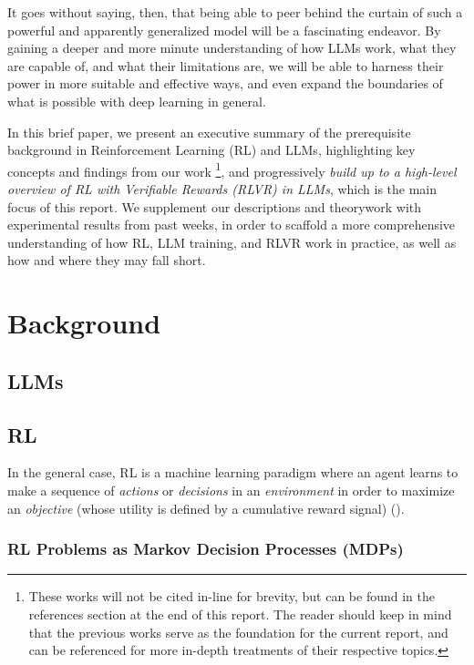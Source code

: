 \documentclass{article} %
\theoremstyle{definition}
\begin{document}
It goes without saying, then, that being able to peer behind the curtain of such a powerful
and apparently generalized model will be a fascinating endeavor. By gaining a deeper
and more minute understanding of how LLMs work, what they are capable of,
and what their limitations are, we will be able to harness their power
in more suitable and effective ways, and even expand the boundaries 
of what is possible with deep learning in general.

In this brief paper, we present an executive summary of the prerequisite background
in Reinforcement Learning (RL) and LLMs, highlighting key concepts and findings from our work \footnote{
    These works will not be cited in-line for brevity,
    but can be found in the references section at the end of this report.
    The reader should keep in mind that the previous works serve as the foundation
    for the current report, and can be referenced for more in-depth treatments
    of their respective topics.
},
and progressively \textit{build up to a high-level overview of RL with Verifiable Rewards (RLVR) in LLMs},
which is the main focus of this report.
We supplement our descriptions and theorywork with experimental results
from past weeks, in order to scaffold a more comprehensive understanding
of how RL, LLM training, and RLVR work in practice, as well as how and where
they may fall short.

\section{Background}
\subsection{LLMs}



\subsection{RL}

In the general case, RL is a machine learning paradigm
where an agent learns to make a sequence of \textit{actions} or \textit{decisions} 
in an \textit{environment} in order to maximize an \textit{objective} 
(whose utility is defined by a cumulative reward signal) (\cite{Sutton-and-Barto-1998}).

\subsubsection{RL Problems as Markov Decision Processes (MDPs)}
\end{document}

